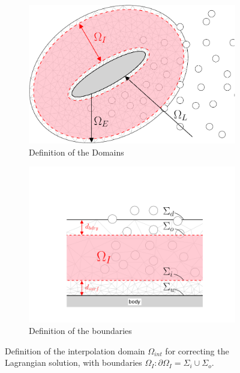 	\begin{figure}[!t]
        \centering
        \begin{subfigure}[b]{0.45\textwidth}
                \includegraphics[width=\textwidth]{figures/hybrid/interpolationDomain/interpolationDomainExpanded-crop.pdf}
                \caption{Definition of the Domains}
                \label{fig:interpolationDomainExpanded}
        \end{subfigure}%
        \qquad %
        \begin{subfigure}[b]{0.45\textwidth}
                \includegraphics[trim = 30mm 10mm 30mm 10mm, clip, width=\textwidth]{figures/hybrid/interpolationDomain/interpolationDomainCloseup.png}
                \caption{Definition of the boundaries}
                \label{fig:interpolationDomainCloseup}
        \end{subfigure}
        \caption{Definition of the interpolation domain $\Omega_{int}$ for correcting the Lagrangian solution, with boundaries $\Omega_I: \partial\Omega_I=\Sigma_{i}\cup\Sigma_{o}$.}
        \label{fig:interpolationDomainDefinition}
	\end{figure}		

